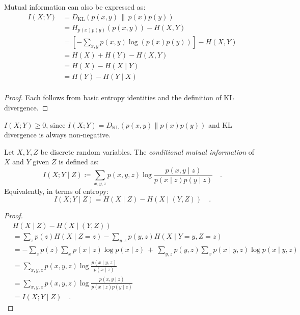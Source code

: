 \documentclass[../../main.tex]{subfiles}
\begin{document}
\begin{proposition}
    Mutual information can also be expressed as:
    \begin{align*}
        I(X; Y) &= D_{\mathrm{KL}}(p(x,y) \,\|\, p(x)p(y)) \\
        &= H_{p(x)p(y)}(p(x,y)) - H(X, Y) \\
        &= \left[ -\sum_{x,y} p(x,y) \log(p(x)p(y)) \right] - H(X, Y) \\
        &= H(X) + H(Y) - H(X, Y) \\
        &= H(X) - H(X \mid Y) \\
        &= H(Y) - H(Y \mid X) \\
    \end{align*}
\end{proposition}
\begin{proof}
    Each follows from basic entropy identities and the definition of KL divergence.
\end{proof}

\begin{corollary}
    $I(X; Y) \geq 0$, since \( I(X; Y) = D_{\mathrm{KL}}(p(x,y) \| p(x)p(y)) \) and KL divergence is always non-negative.
\end{corollary}


\begin{definition}
    Let \( X, Y, Z \) be discrete random variables. The \emph{conditional mutual information} of \( X \) and \( Y \) given \( Z \) is defined as:
    \[
        I(X; Y \mid Z) \coloneqq \sum_{x, y, z} p(x, y, z) \log \frac{p(x, y \mid z)}{p(x \mid z) p(y \mid z)} \quad .
    \]
    Equivalently, in terms of entropy:
    \[
        I(X; Y \mid Z) = H(X \mid Z) - H(X \mid (Y, Z)) \quad .
    \]
\end{definition}
\begin{proof}
    \begin{align*}
        &H(X \mid Z) - H(X \mid (Y, Z)) \\
        &= \sum_{z} p(z) H(X \mid Z = z) - \sum_{y, z} p(y, z) H(X \mid Y = y, Z = z) \\
        &= - \sum_{z} p(z) \sum_{x} p(x \mid z) \log p(x \mid z)
        \ + \ \sum_{y,z} p(y,z) \sum_x p(x \mid y, z) \log p(x \mid y, z) \\
        &= \sum_{x,y,z} p(x, y, z) \log \frac{p(x \mid y, z)}{p(x \mid z)} \\
        &= \sum_{x,y,z} p(x, y, z) \log \frac{p(x, y \mid z)}{p(x \mid z) p(y \mid z)} \\
        &= I(X; Y \mid Z)  \quad .
    \end{align*}
\end{proof}
\end{document}
